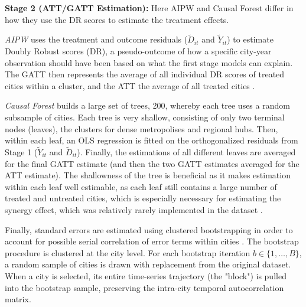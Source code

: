 \documentclass[12pt, a4paper]{article}
\begin{document}
\textbf{Stage 2 (ATT/GATT Estimation): } Here AIPW and Causal Forest differ in how they use the DR scores to estimate the treatment effects.

\textit{AIPW} uses the treatment and outcome residuals ($\tilde{D}_{it}$ and $\tilde{Y}_{it}$) to estimate Doubly Robust scores (DR), a pseudo-outcome of how a specific city-year observation should have been based on what the first stage models can explain. The GATT then represents the average of all individual DR scores of treated cities within a cluster, and the ATT the average of all treated cities \citep[See][]{chernozhukovDoubleDebiasedMachine2018}.

\textit{Causal Forest} builds a large set of trees, 200, whereby each tree uses a random subsample of cities. Each tree is very shallow, consisting of only two terminal nodes (leaves), the clusters for dense metropolises and regional hubs. Then, within each leaf, an OLS regression is fitted on the orthogonalized residuals from Stage 1 ($\tilde{Y}_{it}$ and $\tilde{D}_{it}$). Finally, the estimations of all different leaves are averaged for the final GATT estimate (and then the two GATT estimates averaged for the ATT estimate). The shallowness of the tree is beneficial as it makes estimation within each leaf well estimable, as each leaf still contains a large number of treated and untreated cities, which is especially necessary for estimating the synergy effect, which was relatively rarely implemented in the dataset \citep[See][]{wagerEstimationInferenceHeterogeneous2018, atheyGeneralizedRandomForests2019}.

Finally, standard errors are estimated using clustered bootstrapping in order to account for possible serial correlation of error terms within cities \citep[See][]{cameronBootstrapBasedImprovementsInference2008}. The bootstrap procedure is clustered at the city level. For each bootstrap iteration $b \in \{1, \dots, B\}$, a random sample of cities is drawn with replacement from the original dataset. When a city is selected, its entire time-series trajectory (the "block") is pulled into the bootstrap sample, preserving the intra-city temporal autocorrelation matrix.
\end{document}
